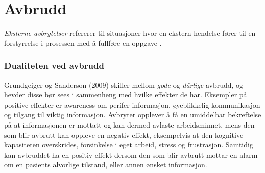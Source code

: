 \section{Avbrudd}
\label{chp: avbrudd} 
\emph{Eksterne avbrytelser} refererer til situasjoner hvor en ekstern hendelse fører til en forstyrrelse i prosessen med å fullføre en oppgave \cite{Harr07}.

\subsubsection{Dualiteten ved avbrudd}
Grundgeiger og Sanderson (2009) \nocite{Grundgeiger09} skiller mellom \emph{gode} og \emph{dårlige} avbrudd, og hevder disse bør sees i sammenheng med hvilke effekter de har. Eksempler på positive effekter er awareness om perifer informasjon, øyeblikkelig kommunikasjon og tilgang til viktig informasjon. Avbryter opplever å få en umiddelbar bekreftelse på at informasjonen er mottatt og kan dermed avlaste arbeidsminnet, mens den som blir avbrutt kan oppleve en negativ effekt, eksempelvis at den kognitive kapasiteten overskrides, forsinkelse i eget arbeid, stress og frustrasjon. Samtidig kan avbruddet ha en positiv effekt dersom den som blir avbrutt mottar en alarm om en pasients alvorlige tilstand, eller annen ønsket informasjon.


